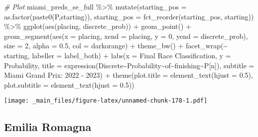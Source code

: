 \documentclass[
]{book}
\newenvironment{Shaded}{\begin{snugshade}}{\end{snugshade}}
\newcommand{\AttributeTok}[1]{\textcolor[rgb]{0.77,0.63,0.00}{#1}}
\newcommand{\CommentTok}[1]{\textcolor[rgb]{0.56,0.35,0.01}{\textit{#1}}}
\newcommand{\DecValTok}[1]{\textcolor[rgb]{0.00,0.00,0.81}{#1}}
\newcommand{\FloatTok}[1]{\textcolor[rgb]{0.00,0.00,0.81}{#1}}
\newcommand{\FunctionTok}[1]{\textcolor[rgb]{0.00,0.00,0.00}{#1}}
\newcommand{\NormalTok}[1]{#1}
\newcommand{\SpecialCharTok}[1]{\textcolor[rgb]{0.00,0.00,0.00}{#1}}
\newcommand{\StringTok}[1]{\textcolor[rgb]{0.31,0.60,0.02}{#1}}
\begin{document}
\begin{Shaded}
\begin{Highlighting}[]
\CommentTok{\# Plot}
\NormalTok{miami\_preds\_se\_full }\SpecialCharTok{\%\textgreater{}\%}
  \FunctionTok{mutate}\NormalTok{(}\AttributeTok{starting\_pos =} \FunctionTok{as.factor}\NormalTok{(}\FunctionTok{paste0}\NormalTok{(}\StringTok{\textquotesingle{}P\textquotesingle{}}\NormalTok{,starting)),}
         \AttributeTok{starting\_pos =} \FunctionTok{fct\_reorder}\NormalTok{(starting\_pos, starting)) }\SpecialCharTok{\%\textgreater{}\%}
  \FunctionTok{ggplot}\NormalTok{(}\FunctionTok{aes}\NormalTok{(placing, discrete\_prob)) }\SpecialCharTok{+}
  \FunctionTok{geom\_point}\NormalTok{() }\SpecialCharTok{+}
  \FunctionTok{geom\_segment}\NormalTok{(}\FunctionTok{aes}\NormalTok{(}\AttributeTok{x =}\NormalTok{ placing, }\AttributeTok{xend =}\NormalTok{ placing, }\AttributeTok{y =} \DecValTok{0}\NormalTok{, }\AttributeTok{yend =}\NormalTok{ discrete\_prob),}
               \AttributeTok{size =} \DecValTok{2}\NormalTok{, }\AttributeTok{alpha =} \FloatTok{0.5}\NormalTok{, }\AttributeTok{col =} \StringTok{\textquotesingle{}darkorange\textquotesingle{}}\NormalTok{) }\SpecialCharTok{+}
  \FunctionTok{theme\_bw}\NormalTok{() }\SpecialCharTok{+}
  \FunctionTok{facet\_wrap}\NormalTok{(}\SpecialCharTok{\textasciitilde{}}\NormalTok{ starting, }\AttributeTok{labeller =}\NormalTok{ label\_both) }\SpecialCharTok{+}
  \FunctionTok{labs}\NormalTok{(}\AttributeTok{x =} \StringTok{\textquotesingle{}Final Race Classification\textquotesingle{}}\NormalTok{,}
       \AttributeTok{y =} \StringTok{\textquotesingle{}Probability\textquotesingle{}}\NormalTok{,}
       \AttributeTok{title =} \FunctionTok{expression}\NormalTok{(Discrete}\SpecialCharTok{\textasciitilde{}}\NormalTok{Probability}\SpecialCharTok{\textasciitilde{}}\NormalTok{of}\SpecialCharTok{\textasciitilde{}}\NormalTok{finishing}\SpecialCharTok{\textasciitilde{}}\NormalTok{P[n]),}
       \AttributeTok{subtitle =} \StringTok{\textquotesingle{}Miami Grand Prix: 2022 {-} 2023\textquotesingle{}}\NormalTok{) }\SpecialCharTok{+}
  \FunctionTok{theme}\NormalTok{(}\AttributeTok{plot.title =} \FunctionTok{element\_text}\NormalTok{(}\AttributeTok{hjust =} \FloatTok{0.5}\NormalTok{),}
        \AttributeTok{plot.subtitle =} \FunctionTok{element\_text}\NormalTok{(}\AttributeTok{hjust =} \FloatTok{0.5}\NormalTok{)) }
\end{Highlighting}
\end{Shaded}

\texttt{[image: \_main\_files/figure-latex/unnamed-chunk-178-1.pdf]}

\hypertarget{emilia-romagna}{%
\subsection{Emilia Romagna}\label{emilia-romagna}}
\end{document}
